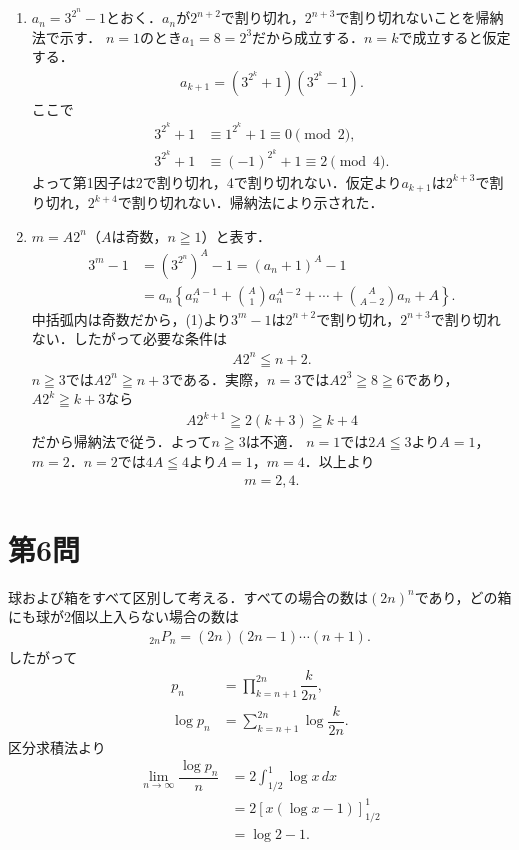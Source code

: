 \documentclass[../main.tex]{subfiles}
\begin{document}
\begin{enumerate}
  \item $a_n=3^{2^n}-1$とおく．$a_n$が$2^{n+2}$で割り切れ，$2^{n+3}$で割り切れないことを帰納法で示す．
    $n=1$のとき$a_1=8=2^3$だから成立する．$n=k$で成立すると仮定する．
    \begin{align}
      a_{k+1}=(3^{2^k}+1)(3^{2^k}-1).
    \end{align}
    ここで
    \begin{align}
      3^{2^k}+1&\equiv 1^{2^k}+1\equiv0\pmod{2},\\
      3^{2^k}+1&\equiv(-1)^{2^k}+1\equiv2\pmod{4}.
    \end{align}
    よって第1因子は2で割り切れ，4で割り切れない．仮定より$a_{k+1}$は$2^{k+3}$で割り切れ，$2^{k+4}$で割り切れない．帰納法により示された．
  \item $m=A2^n$（$A$は奇数，$n\geqq1$）と表す．
    \begin{align}
      3^m-1&=(3^{2^n})^A-1=(a_n+1)^A-1\\
      &=a_n\left\{a_n^{A-1}+\binom{A}{1}a_n^{A-2}+\cdots+\binom{A}{A-2}a_n+A\right\}.
    \end{align}
    中括弧内は奇数だから，(1)より$3^m-1$は$2^{n+2}$で割り切れ，$2^{n+3}$で割り切れない．したがって必要な条件は
    \begin{align}
      A2^n\leqq n+2.
    \end{align}
    $n\geqq3$では$A2^n\geqq n+3$である．実際，$n=3$では$A2^3\geqq8\geqq6$であり，$A2^k\geqq k+3$なら
    \begin{align}
      A2^{k+1}\geqq2(k+3)\geqq k+4
    \end{align}
    だから帰納法で従う．よって$n\geqq3$は不適．
    $n=1$では$2A\leqq3$より$A=1$，$m=2$．$n=2$では$4A\leqq4$より$A=1$，$m=4$．以上より
    \begin{align}
      m=2,4.
    \end{align}
\end{enumerate}
\newpage

\section*{第6問}

球および箱をすべて区別して考える．すべての場合の数は$(2n)^n$であり，どの箱にも球が2個以上入らない場合の数は
\begin{align}{}_{2n}P_n=(2n)(2n-1)\cdots(n+1).
\end{align}
したがって
\begin{align}
  p_n&=\prod_{k=n+1}^{2n}\dfrac{k}{2n},\\
  \log p_n&=\sum_{k=n+1}^{2n}\log\dfrac{k}{2n}.
\end{align}
区分求積法より
\begin{align}
  \lim_{n\to\infty}\dfrac{\log p_n}{n}
  &=2\int_{1/2}^1\log x\,dx\\
  &=2\left[x(\log x-1)\right]_{1/2}^1\\
  &=\log2-1.
\end{align}
\newpage
\end{document}
